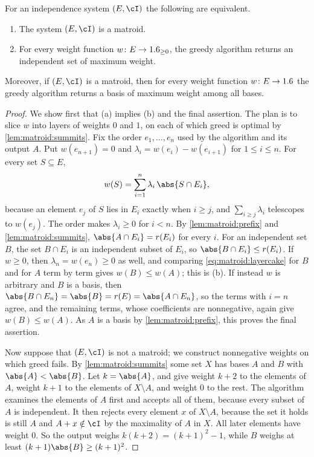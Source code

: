 \begin{refsection}
\begin{theorem}\label{thm:matroid:greedy}
For an independence system $(E,\cI)$ the following are equivalent.
\begin{enumerate}[label=(\alph*)]
\item The system $(E,\cI)$ is a matroid.
\item For every weight function $w\colon E\to1.6_{\ge0}$, the greedy algorithm returns an independent set of maximum weight.
\end{enumerate}
Moreover, if $(E,\cI)$ is a matroid, then for every weight function $w\colon E\to1.6$ the greedy algorithm returns a basis of maximum weight among all bases.
\end{theorem}

\begin{proof}
We show first that (a) implies (b) and the final assertion. The plan is to slice $w$ into layers of weights $0$ and $1$, on each of which greed is optimal by \cref{lem:matroid:summits}. Fix the order $e_1,\dots,e_n$ used by the algorithm and its output $A$. Put $w(e_{n+1})=0$ and $\lambda_i=w(e_i)-w(e_{i+1})$ for $1\le i\le n$. For every set $S\subseteq E$,
\begin{equation}\label{eq:matroid:layercake}
w(S)=\sum_{i=1}^{n}\lambda_i\,\abs{S\cap E_i},
\end{equation}
because an element $e_j$ of $S$ lies in $E_i$ exactly when $i\ge j$, and $\sum_{i\ge j}\lambda_i$ telescopes to $w(e_j)$. The order makes $\lambda_i\ge0$ for $i<n$. By \cref{lem:matroid:prefix} and \cref{lem:matroid:summits}, $\abs{A\cap E_i}=r(E_i)$ for every $i$. For an independent set $B$, the set $B\cap E_i$ is an independent subset of $E_i$, so $\abs{B\cap E_i}\le r(E_i)$. If $w\ge0$, then $\lambda_n=w(e_n)\ge0$ as well, and comparing \cref{eq:matroid:layercake} for $B$ and for $A$ term by term gives $w(B)\le w(A)$; this is (b). If instead $w$ is arbitrary and $B$ is a basis, then $\abs{B\cap E_n}=\abs{B}=r(E)=\abs{A\cap E_n}$, so the terms with $i=n$ agree, and the remaining terms, whose coefficients are nonnegative, again give $w(B)\le w(A)$. As $A$ is a basis by \cref{lem:matroid:prefix}, this proves the final assertion.

Now suppose that $(E,\cI)$ is not a matroid; we construct nonnegative weights on which greed fails. By \cref{lem:matroid:summits} some set $X$ has bases $A$ and $B$ with $\abs{A}<\abs{B}$. Let $k=\abs{A}$, and give weight $k+2$ to the elements of $A$, weight $k+1$ to the elements of $X\setminus A$, and weight $0$ to the rest. The algorithm examines the elements of $A$ first and accepts all of them, because every subset of $A$ is independent. It then rejects every element $x$ of $X\setminus A$, because the set it holds is still $A$ and $A+x\notin\cI$ by the maximality of $A$ in $X$. All later elements have weight $0$. So the output weighs $k(k+2)=(k+1)^2-1$, while $B$ weighs at least $(k+1)\abs{B}\ge(k+1)^2$.
\end{proof}


\end{refsection}
